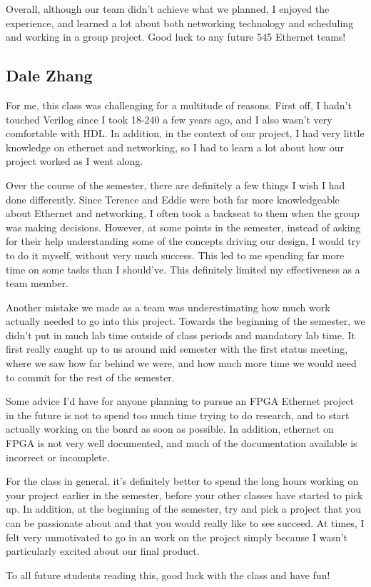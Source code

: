 \documentclass[12pt]{report}
\begin{document}
Overall, although our team didn't achieve what we planned, I enjoyed the experience, and learned a lot about both networking technology and scheduling and working in a group project. Good luck to any future 545 Ethernet teams!

\subsection{Dale Zhang}
For me, this class was challenging for a multitude of reasons. First off, I hadn't touched Verilog since I took 18-240 a few years ago, and I also wasn't very comfortable with HDL. In addition, in the context of our project, I had very little knowledge on ethernet and networking, so I had to learn a lot about how our project worked as I went along.

Over the course of the semester, there are definitely a few things I wish I had done differently. Since Terence and Eddie were both far more knowledgeable about Ethernet and networking, I often took a backseat to them when the group was making decisions. However, at some points in the semester, instead of asking for their help understanding some of the concepts driving our design, I would try to do it myself, without very much success. This led to me spending far more time on some tasks than I should've. This definitely limited my effectiveness as a team member.

Another mistake we made as a team was underestimating how much work actually needed to go into this project. Towards the beginning of the semester, we didn't put in much lab time outside of class periods and mandatory lab time. It first really caught up to us around mid semester with the first status meeting, where we saw how far behind we were, and how much more time we would need to commit for the rest of the semester.

Some advice I'd have for anyone planning to pursue an FPGA Ethernet project in the future is not to spend too much time trying to do research, and to start actually working on the board as soon as possible. In addition, ethernet on FPGA is not very well documented, and much of the documentation available is incorrect or incomplete.

For the class in general, it's definitely better to spend the long hours working on your project earlier in the semester, before your other classes have started to pick up. In addition, at the beginning of the semester, try and pick a project that you can be passionate about and that you would really like to see succeed. At times, I felt very unmotivated to go in an work on the project simply because I wasn't particularly excited about our final product.

To all future students reading this, good luck with the class and have fun!

\printbibliography
\end{document}
